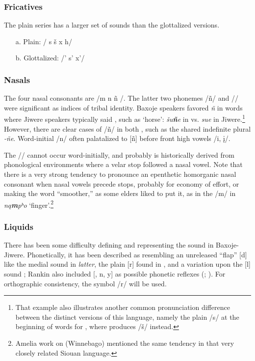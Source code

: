 \documentclass[output=paper]{LSP/langsci}
\begin{document}
\subsubsection{Fricatives}  The plain series has a larger set of sounds than the glottalized versions.  				
\begin{itemize}
\item[a.] Plain: 	  /  s  \v{s}  x   h/   								        	
\item[b.] Glottalized:  /'     s'    x'/	
\end{itemize}
 						    
\subsubsection{Nasals}  The four nasal consonants are /m n ñ /.  The latter two phonemes /ñ/ and // were significant as indices of tribal identity. Baxoje speakers favored \textit{ñ} in words where Jiwere speakers typically said \textit{}, such as `horse': \textit{\v{s}u\textbf{ñ}e} in  vs. \textit{su\textbf{}e} in Jiwere.\footnote{That example also illustrates another common pronunciation difference between the distinct versions of this language, namely the plain /s/ at the beginning of words for , where  produces /\v{s}/ instead.}   However, there are clear cases of  /ñ/ in both , such as the shared indefinite plural \textit{-ñe}.  Word-initial /n/ often palatalized to [ñ] before front high vowels /i, \k{i}/.  

The // cannot occur word-initially, and probably is historically derived from phonological environments where a velar stop followed a nasal vowel.  Note that there is a very strong tendency to pronounce an  epenthetic homorganic nasal consonant when nasal vowels precede stops, probably for economy of effort, or making the word ``smoother,'' as some elders liked to put it, as in the /m/ in \textit{n\k{a}\textbf{m}pʰo} `finger'.\footnote{Amelia  work on  (Winnebago) mentioned the same tendency in that very closely related Siouan language.}

\subsubsection{Liquids}  There has been some difficulty defining and representing the  sound in Baxoje-Jiwere.  Phonetically, it has been described as resembling an unreleased ``flap'' [d] like the medial sound in \textit{latter}, the plain [r] found in , and a variation upon the [l] sound \citep[235]{Whitman1947};  Rankin also included [, n, y] as possible phonetic reflexes (\citealt[346]{Wedel2001}; \citealt[447]{Schweitzer2001}). For orthographic consistency, the symbol /r/ will be used. 
\end{document}
